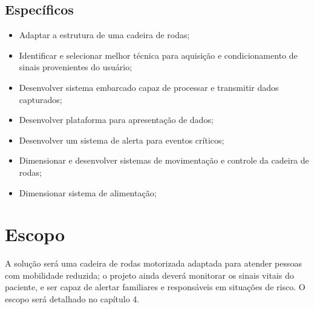 \subsection{Específicos}

\begin{itemize}
\item Adaptar a estrutura de uma cadeira de rodas;
\item Identificar e selecionar melhor técnica para aquisição e condicionamento de sinais provenientes do usuário;
\item Desenvolver sistema embarcado capaz de processar e transmitir dados capturados;
\item Desenvolver plataforma para apresentação de dados;
\item Desenvolver um sistema de alerta para eventos críticos;
\item Dimensionar e desenvolver sistemas de movimentação e controle da cadeira de rodas;
\item Dimensionar sistema de alimentação;
\end{itemize}

\section{Escopo}

A solução será uma cadeira de rodas motorizada adaptada para atender pessoas
com mobilidade reduzida; o projeto ainda deverá monitorar os sinais vitais
do paciente, e ser capaz de alertar familiares e responsáveis em
situações de risco. O escopo será detalhado no capítulo 4.


